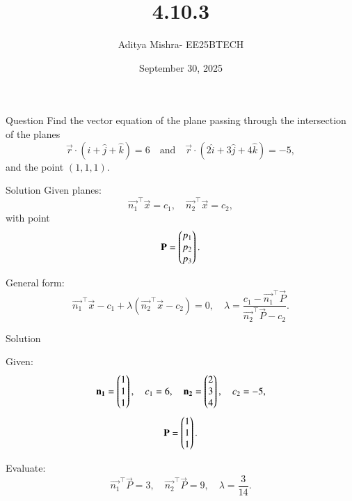 \documentclass{beamer}
\title{4.10.3}
\author{Aditya Mishra- EE25BTECH}
\date{September 30, 2025}
\begin{document}
\begin{frame}
\titlepage
\end{frame}

\begin{frame}{Question}
Find the vector equation of the plane passing through the intersection of the planes
\[
\vec{r} \cdot (\hat{i} + \hat{j} + \hat{k}) = 6 \quad \text{and} \quad \vec{r} \cdot (2\hat{i} + 3\hat{j} + 4\hat{k}) = -5,
\]
and the point $(1, 1, 1)$.
\end{frame}

\begin{frame}{Solution}
Given planes:
\[
\vec{n_1}^\top \vec{x} = c_1, \quad \vec{n_2}^\top \vec{x} = c_2,
\]
with point 
\[
\mathbf{P} = \begin{pmatrix}p_1 \\ p_2 \\ p_3\end{pmatrix}.
\]

General form:
\[
\vec{n_1}^\top \vec{x} - c_1 + \lambda(\vec{n_2}^\top \vec{x} - c_2) = 0,
\quad
\lambda = \frac{c_1 - \vec{n_1}^\top \vec{P}}{\vec{n_2}^\top \vec{P} - c_2}.
\]
\end{frame}

\begin{frame}{Solution}

Given:
\[
\mathbf{n_1} = \begin{pmatrix}1 \\ 1 \\ 1\end{pmatrix},\quad c_1 = 6, \quad
\mathbf{n_2} = \begin{pmatrix}2 \\ 3 \\ 4\end{pmatrix},\quad c_2 = -5,
\]
\[
\mathbf{P} = \begin{pmatrix}1 \\ 1 \\ 1\end{pmatrix}.
\]

Evaluate:
\[
\vec{n_1}^\top \vec{P} = 3, \quad \vec{n_2}^\top \vec{P} = 9, \quad \lambda = \frac{3}{14}.
\]
\end{frame}
\end{document}
